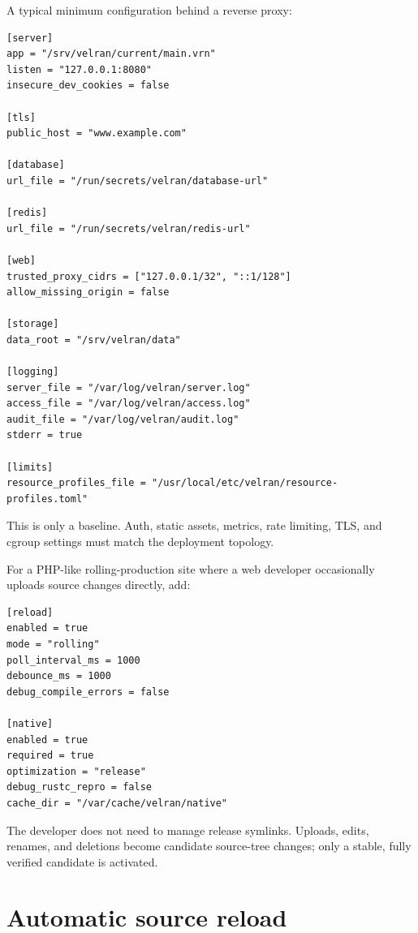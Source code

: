A typical minimum configuration behind a reverse proxy:

\begin{lstlisting}
[server]
app = "/srv/velran/current/main.vrn"
listen = "127.0.0.1:8080"
insecure_dev_cookies = false

[tls]
public_host = "www.example.com"

[database]
url_file = "/run/secrets/velran/database-url"

[redis]
url_file = "/run/secrets/velran/redis-url"

[web]
trusted_proxy_cidrs = ["127.0.0.1/32", "::1/128"]
allow_missing_origin = false

[storage]
data_root = "/srv/velran/data"

[logging]
server_file = "/var/log/velran/server.log"
access_file = "/var/log/velran/access.log"
audit_file = "/var/log/velran/audit.log"
stderr = true

[limits]
resource_profiles_file = "/usr/local/etc/velran/resource-profiles.toml"
\end{lstlisting}

This is only a baseline. Auth, static assets, metrics, rate limiting, TLS, and cgroup settings must match the deployment topology.

For a PHP-like rolling-production site where a web developer occasionally uploads source changes directly, add:

\begin{lstlisting}
[reload]
enabled = true
mode = "rolling"
poll_interval_ms = 1000
debounce_ms = 1000
debug_compile_errors = false

[native]
enabled = true
required = true
optimization = "release"
debug_rustc_repro = false
cache_dir = "/var/cache/velran/native"
\end{lstlisting}

The developer does not need to manage release symlinks. Uploads, edits, renames, and deletions become candidate source-tree changes; only a stable, fully verified candidate is activated.


\section{Automatic source reload}

